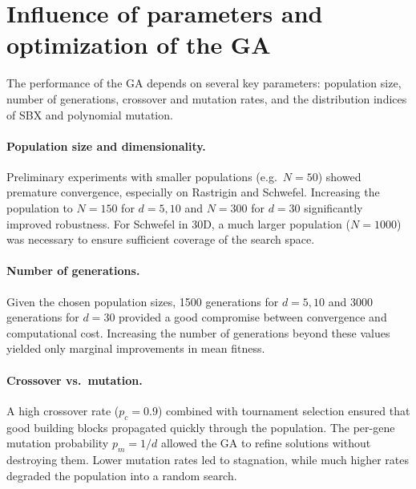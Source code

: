 \documentclass[a4paper,11pt]{article}
\begin{document}
\clearpage

\section{Influence of parameters and optimization of the GA}

\vspace{1em}

The performance of the GA depends on several key parameters:
population size, number of generations, crossover and mutation rates, and
the distribution indices of SBX and polynomial mutation.

\vspace{1em}

\paragraph{Population size and dimensionality.}
Preliminary experiments with smaller populations (e.g.\ $N=50$) showed premature
convergence, especially on Rastrigin and Schwefel. Increasing the population to
$N=150$ for $d=5,10$ and $N=300$ for $d=30$ significantly improved robustness.
For Schwefel in 30D, a much larger population ($N=1000$) was necessary to ensure
sufficient coverage of the search space.

\vspace{0.8em}

\paragraph{Number of generations.}
Given the chosen population sizes, 1500 generations for $d=5,10$ and 3000
generations for $d=30$ provided a good compromise between convergence and
computational cost. Increasing the number of generations beyond these values
yielded only marginal improvements in mean fitness.

\vspace{0.8em}

\paragraph{Crossover vs.\ mutation.}
A high crossover rate ($p_c = 0.9$) combined with tournament selection ensured
that good building blocks propagated quickly through the population. The
per-gene mutation probability $p_m = 1/d$ allowed the GA to refine solutions
without destroying them. Lower mutation rates led to stagnation, while much
higher rates degraded the population into a random search.
\end{document}
